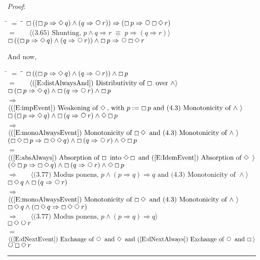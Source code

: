 \documentclass[12pt, fleqn, leqno]{article}
\newcommand{\lgap}{2pt}                             %
\newcommand{\mymathindent}{24pt}                    %
\newcommand{\equivs}{\ensuremath{\;\equiv\;}}       %
\newcommand{\impl}{\ensuremath{\Rightarrow}}        %
\newcommand{\Next}{\;\,\text{\raisebox{3.5pt}{\circle{6}}}}
\newcommand{\Event}{\Diamond\,}
\newcommand{\Always}{\Box\,}
\newcommand{\myqed}{\rule[-.23ex]{1.2ex}{2.0ex}}
\newcommand{\myqedtab}{\hspace{384pt}}              %
\newcommand{\Gll} {\langle}                         %
\newcommand{\Ggg} {\rangle}                         %
\newcommand{\Hint}[1]     {\ \ \ $\Gll              \mbox{#1} \Ggg$ }   %
\begin{document}
\emph{Proof}:
\begin{tabbing}
\hspace{\mymathindent} \= $= \;$ \= \myqedtab \= \kill
  \> \>   $\Always ((\Always p \impl \Event q) \land (q \impl \Next r)) \impl (\Always p \impl \Next \Always \Event r)$\\[\lgap]
  \> $=$  \>  \Hint{(3.65) Shunting, $p\land q\impl r\equivs p\impl (q\impl r)$}\\[\lgap]
  \> \>   $\Always ((\Always p \impl \Event q) \land (q \impl \Next r)) \land \Always p \impl \Next \Always \Event r$
\end{tabbing}
And now,
\begin{tabbing}
\hspace{\mymathindent} \= $= \;$ \= \myqedtab \= \kill
  \> \>   $\Always ((\Always p \impl \Event q) \land (q \impl \Next r)) \land \Always p$\\[\lgap]
  \> $=$  \>  \Hint{(\ref{E:distAlwaysAnd}) Distributivity of $\Always$ over $\land$}\\[\lgap]
   \> \>   $\Always (\Always p \impl \Event q) \land \Always (q \impl \Next r) \land \Always p$\\[\lgap]
  \> $\impl$  \>  \Hint{(\ref{E:impEvent}) Weakening of $\Event$, with $p := \Always p$ and (4.3) Monotonicity of $\land$ }\\[\lgap]
     \> \>   $\Always (\Always p \impl \Event q) \land \Always (q \impl \Next r) \land \Event\Always p$\\[\lgap]
  \> $\impl$  \>  \Hint{(\ref{E:monoAlwaysEvent}) Monotonicity of $\Always\Event$ and (4.3) Monotonicity of $\land$ }\\[\lgap]
    \> \>   $(\Always\Event\Always p \impl \Always\Event\Event q) \land \Always (q \impl \Next r) \land \Event\Always p$\\[\lgap]
  \> $=$  \>  \Hint{(\ref{E:absAlways}) Absorption of $\Always$ into $\Event\Always$ and (\ref{E:IdemEvent}) Absorption of $\Event$ }\\[\lgap]
      \> \>   $(\Event\Always p \impl \Always\Event q) \land \Always (q \impl \Next r) \land \Event\Always p$\\[\lgap]
      \> $\impl$  \>  \Hint{(3.77) Modus ponens, $p\land (p\impl q)\impl q$ and (4.3) Monotonicity of $\land$}\\[\lgap]
         \> \>   $ \Always\Event q \land \Always (q \impl \Next r)$\\[\lgap]
   \> $\impl$  \>  \Hint{(\ref{E:monoAlwaysEvent}) Monotonicity of $\Always\Event$ and (4.3) Monotonicity of $\land$ }\\[\lgap]
    \> \>   $ \Always\Event q \land (\Always\Event q \impl \Always\Event\Next r)$\\[\lgap]
     \> $\impl$  \>  \Hint{(3.77) Modus ponens, $p\land (p\impl q)\impl q$}\\[\lgap]
     \> \>   $ \Always\Event\Next r$\\[\lgap]
      \> $=$  \>  \Hint{(\ref{E:dNextEvent}) Exchange of $\Next$ and $\Event$ and (\ref{E:dNextAlways}) Exchange of $\Next$ and $\Always$}\\[\lgap]
      \> \>   $ \Next\Always\Event r$  \quad \myqed
\end{tabbing}
\end{document}
